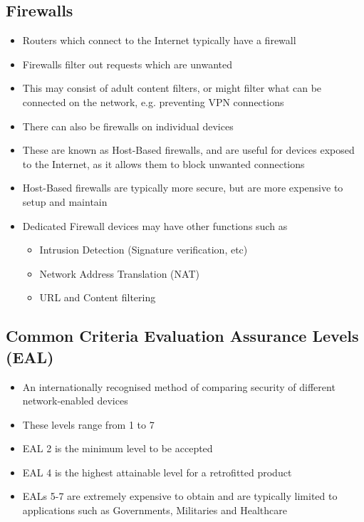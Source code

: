 \subsection*{Firewalls}

\begin{itemize}
  \item Routers which connect to the Internet typically have a firewall
  \item Firewalls filter out requests which are unwanted
  \item This may consist of adult content filters, or might filter what can be connected on the network, e.g. preventing VPN connections
  \item There can also be firewalls on individual devices
  \item These are known as Host-Based firewalls, and are useful for devices exposed to the Internet, as it allows them to block unwanted connections
  \item Host-Based firewalls are typically more secure, but are more expensive to setup and maintain
  \item Dedicated Firewall devices may have other functions such as
  \begin{itemize}
    \item Intrusion Detection (Signature verification, etc)
    \item Network Address Translation (NAT)
    \item URL and Content filtering
  \end{itemize}
\end{itemize}

\subsection*{Common Criteria Evaluation Assurance Levels (EAL)}

\begin{itemize}
  \item An internationally recognised method of comparing security of different network-enabled devices
  \item These levels range from 1 to 7
  \item EAL 2 is the minimum level to be accepted
  \item EAL 4 is the highest attainable level for a retrofitted product
  \item EALs 5-7 are extremely expensive to obtain and are typically limited to applications such as Governments, Militaries and Healthcare
\end{itemize}